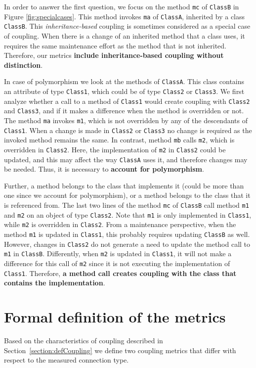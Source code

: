 \documentclass[a4paper]{article}
\begin{document}
In order to answer the first question, we focus on the method \texttt{mc} of \texttt{ClassB} in Figure \ref{fig:specialcases}. This method invokes \texttt{ma} of \texttt{ClassA}, inherited by a class \texttt{ClassB}.
This {\em inheritance-based} coupling is sometimes considered as a special case of coupling. When there is a change of an inherited method that a class uses, it  requires the same maintenance effort as the method that is not inherited. Therefore, our metrics  \textbf{include inheritance-based coupling without distinction}.

In case of polymorphism we look at the methods of \texttt{ClassA}. This class contains an attribute of type \texttt{Class1}, which could be of type \texttt{Class2} or \texttt{Class3}.
We first analyze whether a call to a method of \texttt{Class1} would create coupling with \texttt{Class2} and \texttt{Class3}, and if it makes a difference when the method is overridden or not. The method \texttt{ma} invokes \texttt{m1}, which is not overridden by any of the descendants of \texttt{Class1}. When a change is made in \texttt{Class2} or \texttt{Class3} no change is required as the invoked method remains the same. In contrast, method \texttt{mb} calls \texttt{m2}, which is overridden in \texttt{Class2}. Here, the implementation of \texttt{m2} in \texttt{Class2} could be updated, and this may affect the way \texttt{ClassA} uses it, and therefore changes may be needed. Thus, it is necessary to \textbf{account for polymorphism}.


Further, a method belongs to the class that implements it (could be more than one since we account for polymorphism), or a method belongs to the class that it is referenced from.
The last two lines of the method \texttt{mc} of \texttt{ClassB} call method \texttt{m1} and \texttt{m2} on an object of type \texttt{Class2}. Note that \texttt{m1} is only implemented in \texttt{Class1}, while \texttt{m2} is overridden in \texttt{Class2}. From a maintenance perspective, when the method \texttt{m1} is updated in \texttt{Class1}, this probably requires updating \texttt{ClassB} as well.
However, changes in \texttt{Class2} do not generate a need to update the method call to \texttt{m1} in \texttt{ClassB}.
Differently, when \texttt{m2} is updated in \texttt{Class1}, it will not make a difference for this call of \texttt{m2} since it is not executing the implementation of \texttt{Class1}. Therefore, \textbf{a method call creates coupling with the class that contains the implementation}.

\section{Formal definition of the metrics}\label{section:metrics}
Based on the characteristics of coupling described in Section~\ref{section:defCoupling} we define two coupling metrics that differ with respect to the measured connection type.
\end{document}
